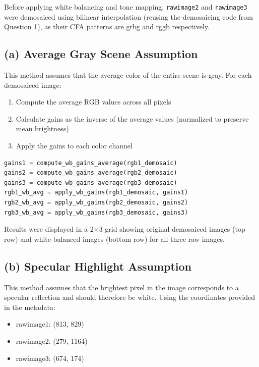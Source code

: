 \documentclass[12pt,a4paper]{article}
\begin{document}
Before applying white balancing and tone mapping, \texttt{rawimage2} and \texttt{rawimage3} were demosaiced using bilinear interpolation (reusing the demosaicing code from Question 1), as their CFA patterns are grbg and rggb respectively.

\subsection{(a) Average Gray Scene Assumption}
This method assumes that the average color of the entire scene is gray. For each demosaiced image:
\begin{enumerate}
    \item Compute the average RGB values across all pixels
    \item Calculate gains as the inverse of the average values (normalized to preserve mean brightness)
    \item Apply the gains to each color channel
\end{enumerate}

\vspace{0.5cm}
\begin{lstlisting}[language=python]
gains1 = compute_wb_gains_average(rgb1_demosaic)
gains2 = compute_wb_gains_average(rgb2_demosaic)
gains3 = compute_wb_gains_average(rgb3_demosaic)
rgb1_wb_avg = apply_wb_gains(rgb1_demosaic, gains1)
rgb2_wb_avg = apply_wb_gains(rgb2_demosaic, gains2)
rgb3_wb_avg = apply_wb_gains(rgb3_demosaic, gains3)
\end{lstlisting}

\vspace{0.2cm}
\noindent Results were displayed in a 2×3 grid showing original demosaiced images (top row) and white-balanced images (bottom row) for all three raw images.

\subsection{(b) Specular Highlight Assumption}
This method assumes that the brightest pixel in the image corresponds to a specular reflection and should therefore be white. Using the coordinates provided in the metadata:
\begin{itemize}
    \item rawimage1: (813, 829)
    \item rawimage2: (279, 1164)
    \item rawimage3: (674, 174)
\end{itemize}
\end{document}
